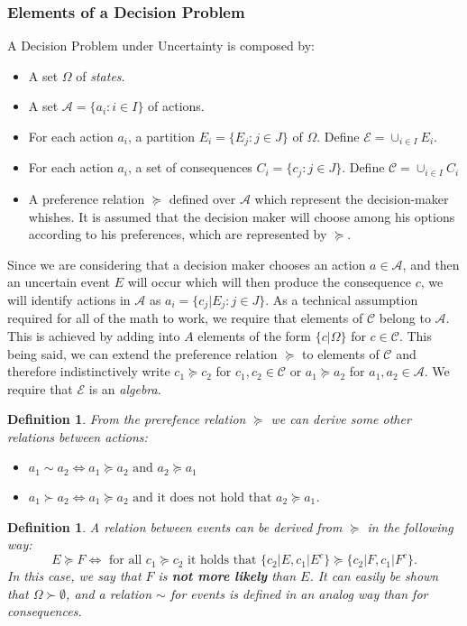 \documentclass[11pt]{article}
\theoremstyle{plain}
\newtheorem{defi}[teo]{Definition}
\begin{document}
	\subsubsection{Elements of a Decision Problem}
	A Decision Problem under Uncertainty is composed by:
	\begin{itemize}
	\item A set $\Omega$ of \textit{states}.
	\item A set $\mathcal{A}=\{a_i : i \in I \}$ of actions.
	\item For each action $a_i$, a partition $E_i = \{ E_j : j \in J \}$ of $\Omega$. Define $\mathcal{E} = \cup_{i \in I } E_i$.
	\item For each action $a_i$, a set of consequences $C_i = \{ c_j : j \in J \}$. Define $\mathcal{C}=\cup_{i \in I} C_i$
	\item A preference relation $\succeq$ defined over $\mathcal{A}$ which represent the decision-maker whishes. It is assumed that the decision maker will choose among his options according to his preferences, which are represented by $\succeq$.
	\end{itemize}
	Since we are considering that a decision maker chooses an action $a \in \mathcal{A}$, and then an uncertain event $E$ will occur which will then produce the consequence $c$, we will identify actions in $\mathcal{A}$ as $a_i = \{ c_j | E_j : j \in J \}$. As a technical assumption required for all of the math to work, we require that elements of $\mathcal{C}$ belong to $\mathcal{A}$. This is achieved by adding into $A$ elements of the form $\{ c | \Omega \}$ for $c \in \mathcal{C}$. This being said, we can extend the preference relation $\succeq$ to elements of $\mathcal{C}$ and therefore indistinctively write $c_1 \succeq c_2$ for $c_1, c_2 \in \mathcal{C}$ or $a_1 \succeq a_2$ for $a_1,a_2 \in \mathcal{A}$. We require that $\mathcal{E}$ is an \textit{algebra}.	
	\begin{defi}
	From the prerefence relation $\succeq$ we can derive some other relations between actions:
	\begin{itemize}
	\item $a_1 \sim a_2 \Leftrightarrow a_1 \succeq a_2 \textrm{ and } a_2 \succeq a_1$
	\item $a_1 \succ a_2 \Leftrightarrow a_1 \succeq a_2 \textrm{ and it does not hold that } a_2 \succeq a_1$.
	\end{itemize}
	\end{defi}
	\begin{defi}
	A relation between events can be derived from $\succeq$ in the following way:
	\[E \succeq F \Leftrightarrow \textrm{ for all } c_1 \succeq c_2 \textrm{ it holds that } \{ c_2 | E, c_1 | E^c \} \succeq \{ c_2 | F, c_1 | F^c \}. \]
	In this case, we say that $F$ is \textbf{not more likely} than $E$. It can easily be shown that $\Omega \succ \emptyset$, and a relation $\sim$ for events is defined in an analog way than for consequences.
	\end{defi}
\end{document}
